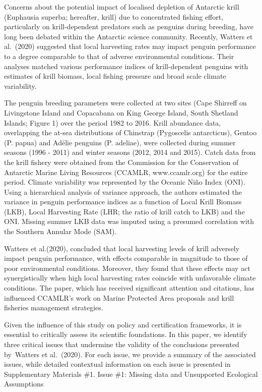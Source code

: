 \documentclass[]{elsarticle} %
\begin{document}
Concerns about the potential impact of localised depletion of Antarctic
krill (Euphausia superba; hereafter, krill) due to concentrated fishing
effort, particularly on krill-dependent predators such as penguins
during breeding, have long been debated within the Antarctic science
community. Recently, Watters et al.~(2020) suggested that local
harvesting rates may impact penguin performance to a degree comparable
to that of adverse environmental conditions. Their analyses matched
various performance indices of krill-dependent penguins with estimates
of krill biomass, local fishing pressure and broad scale climate
variability.

The penguin breeding parameters were collected at two sites (Cape
Shirreff on Livingstone Island and Copacabana on King George Island,
South Shetland Islands; Figure 1) over the period 1982 to 2016. Krill
abundance data, overlapping the at-sea distributions of Chinstrap
(Pygoscelis antarcticus), Gentoo (P. papua) and Adélie penguins (P.
adeliae), were collected during summer seasons (1996 - 2011) and winter
seasons (2012, 2014 and 2015). Catch data from the krill fishery were
obtained from the Commission for the Conservation of Antarctic Marine
Living Resources (CCAMLR, www.ccamlr.org) for the entire period. Climate
variability was represented by the Oceanic Niño Index (ONI). Using a
hierarchical analysis of variance approach, the authors estimated the
variance in penguin performance indices as a function of Local Krill
Biomass (LKB), Local Harvesting Rate (LHR; the ratio of krill catch to
LKB) and the ONI. Missing summer LKB data was imputed using a presumed
correlation with the Southern Annular Mode (SAM).

Watters et al.(2020), concluded that local harvesting levels of krill
adversely impact penguin performance, with effects comparable in
magnitude to those of poor environmental conditions. Moreover, they
found that these effects may act synergistically when high local
harvesting rates coincide with unfavorable climate conditions. The
paper, which has received significant attention and citations, has
influenced CCAMLR's work on Marine Protected Area proposals and krill
fisheries management strategies.

Given the influence of this study on policy and certification
frameworks, it is essential to critically assess its scientific
foundations. In this paper, we identify three critical issues that
undermine the validity of the conclusions presented by~Watters et
al.~(2020). For each issue, we provide a summary of the associated
issues, while detailed contextual information on each issue is presented
in Supplementary Materials \#1. Issue \#1: Missing data and Unsupported
Ecological Assumptions
\end{document}
